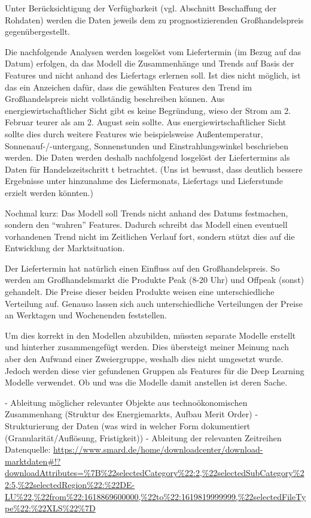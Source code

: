 Unter Berücksichtigung der Verfügbarkeit (vgl. Abschnitt Beschaffung der Rohdaten) werden die Daten jeweils dem zu prognostizierenden Großhandelspreis gegenübergestellt. 

Die nachfolgende Analysen werden losgelöst vom Liefertermin (im Bezug auf das Datum) erfolgen, da das Modell die Zusammenhänge und Trends auf Basis der Features und nicht anhand des Liefertags erlernen soll. Ist dies nicht möglich, ist das ein Anzeichen dafür, dass die gewählten Features den Trend im Großhandelspreis nicht vollständig beschreiben können. Aus energiewirtschaftlicher Sicht gibt es keine Begründung, wieso der Strom am 2. Februar teurer als am 2. August sein sollte. Aus energiewirtschaftlicher Sicht sollte dies durch weitere Features wie beispielsweise Außentemperatur, Sonnenauf-/-untergang, Sonnenstunden und Einstrahlungswinkel beschrieben werden. Die Daten werden deshalb nachfolgend losgelöst der Liefertermins als Daten für Handelszeitschritt t betrachtet. (Uns ist bewusst, dass deutlich bessere Ergebnisse unter hinzunahme des Liefermonats, Liefertags und Lieferstunde erzielt werden könnten.)

Nochmal kurz: Das Modell soll Trends nicht anhand des Datums festmachen, sondern den ``wahren'' Features. Dadurch schreibt das Modell einen eventuell vorhandenen Trend nicht im Zeitlichen Verlauf fort, sondern stützt dies auf die Entwicklung der Marktsituation. 


Der Liefertermin hat natürlich einen Einfluss auf den Großhandelspreis. So werden am Großhandelsmarkt die Produkte Peak (8-20 Uhr) und Offpeak (sonst) gehandelt. Die Preise dieser beiden Produkte weisen eine unterschiedliche Verteilung auf. 
Genauso lassen sich auch unterschiedliche Verteilungen der Preise an Werktagen und Wochenenden feststellen. 

Um dies korrekt in den Modellen abzubilden, müssten separate Modelle erstellt und hinterher zusammengefügt werden. Dies übersteigt meiner Meinung nach aber den Aufwand einer Zweiergruppe, weshalb dies nicht umgesetzt wurde. Jedoch werden diese vier gefundenen Gruppen als Features für die Deep Learning Modelle verwendet. Ob und was die Modelle damit anstellen ist deren Sache.




-	Ableitung möglicher relevanter Objekte aus technoökonomischen Zusammenhang (Struktur des Energiemarkts, Aufbau Merit Order)
-	Strukturierung der Daten (was wird in welcher Form dokumentiert (Granularität/Auflösung, Fristigkeit))
-	Ableitung der relevanten Zeitreihen
Datenquelle: \url{https://www.smard.de/home/downloadcenter/download-marktdaten#!?downloadAttributes=%7B%22selectedCategory%22:2,%22selectedSubCategory%22:5,%22selectedRegion%22:%22DE-LU%22,%22from%22:1618869600000,%22to%22:1619819999999,%22selectedFileType%22:%22XLS%22%7D}